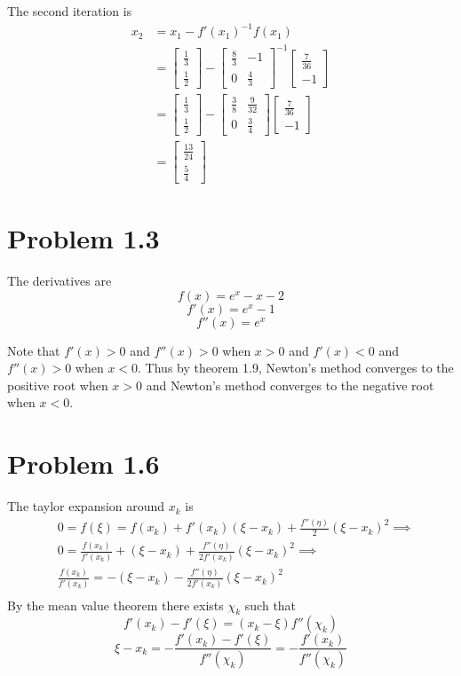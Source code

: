 \documentclass{article}
\begin{document}
The second iteration is 
\begin{align*}
	x_2 &= x_1 - f'(x_1)^{-1}f(x_1) \\
	&= \begin{bmatrix}
		\frac{1}{3} \\ \frac{1}{2}
	\end{bmatrix} -
	\begin{bmatrix}
		\frac{8}{3} & -1 \\
		0 & \frac{4}{3}
	\end{bmatrix}^{-1}
	\begin{bmatrix}
		\frac{7}{36} \\
		-1
	\end{bmatrix} \\
	&= \begin{bmatrix}
		\frac{1}{3} \\ \frac{1}{2}
	\end{bmatrix} -
	\begin{bmatrix}
		\frac{3}{8} & \frac{9}{32} \\
		0 & \frac{3}{4}
	\end{bmatrix}
	\begin{bmatrix}
		\frac{7}{36} \\
		-1
	\end{bmatrix} \\
	&= \begin{bmatrix}
		\frac{13}{24} \\ \frac{5}{4}
	\end{bmatrix}
\end{align*}
\newpage

\section*{Problem 1.3}
The derivatives are 
\[
	f(x) = e^x - x - 2
\]
\[
	f'(x) = e^x -  1
\]
\[
	f''(x) = e^x
\]

Note that $f'(x) > 0$ and $f''(x) > 0$ when $x>0$
and $f'(x) < 0$ and $f''(x) > 0$ when $x<0$.
Thus by theorem 1.9, Newton's method converges to the positive root when $x>0$
and Newton's method converges to the negative root when $x<0$.
\newpage 

\section*{Problem 1.6}

The taylor expansion around $x_k$ is 
\begin{align*}
	&0 = f(\xi) = f(x_k) + f'(x_k)(\xi-x_k) + \frac{f''(\eta)}{2}(\xi-x_k)^2 \implies \\
	&0 = \frac{f(x_k)}{f'(x_k)} + (\xi-x_k) + \frac{f''(\eta)}{2f'(x_k)}(\xi-x_k)^2 \implies \\
	&\frac{f(x_k)}{f'(x_k)} =  -(\xi-x_k)  -\frac{f''(\eta)}{2f'(x_k)}(\xi-x_k)^2 \\
\end{align*}
By the mean value theorem there exists $\chi_k$ such that 
\[
	f'(x_k) - f'(\xi) = (x_k - \xi) f''(\chi_k)
\]
\[
	\xi - x_k = -\frac{f'(x_k) - f'(\xi)}{f''(\chi_k)} = -\frac{f'(x_k)}{f''(\chi_k)}
\]
\end{document}
